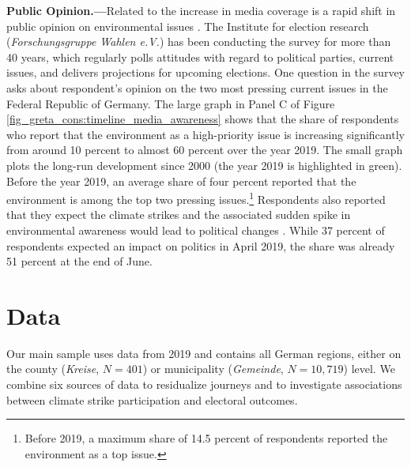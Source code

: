 \textbf{Public Opinion.---}Related to the increase in media coverage is a rapid shift in public opinion on environmental issues \citep{smith2019window}. The Institute for election research (\textit{Forschungsgruppe Wahlen e.V.}) has been conducting the survey \cite{politbarometer2019} for more than 40 years, which regularly polls attitudes with regard to political parties, current issues, and delivers projections for upcoming elections. One question in the survey asks about respondent's opinion on the two most pressing current issues in the Federal Republic of Germany. The large graph in Panel C of Figure \ref{fig_greta_cons:timeline_media_awareness} shows that the share of respondents who report that the environment as a high-priority issue is increasing significantly from around 10 percent to almost 60 percent over the year 2019. The small graph plots the long-run development since 2000 (the year 2019 is highlighted in green). Before the year 2019, an average share of four percent reported that the environment is among the top two pressing issues.\footnote{Before 2019, a maximum share of 14.5 percent of respondents reported the environment as a top issue.} Respondents also reported that they expect the climate strikes and the associated sudden spike in environmental awareness would lead to political changes \citep{ForschungsgruppeWahlen2019FFF}. While 37 percent of respondents expected an impact on politics in April 2019, the share was already 51 percent at the end of June.























\bigskip
\section{Data}\label{sec_greta_cons:data} 
Our main sample uses data from 2019 and contains all German regions, either on the county (\textit{Kreise}, $N=401$) or municipality (\textit{Gemeinde}, $N=10,719$) level. We combine six sources of data to residualize journeys and to investigate associations between climate strike participation and electoral outcomes.


